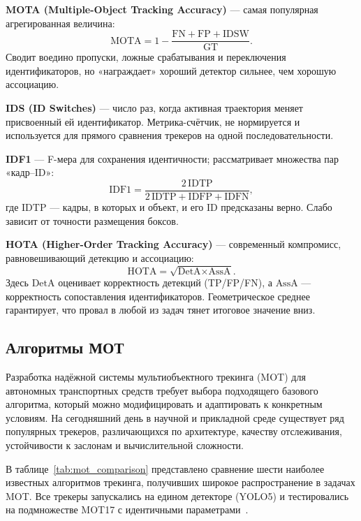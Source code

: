 \textbf{MOTA (Multiple-Object Tracking Accuracy)} --- самая популярная агрегированная величина:  
  \[
     \text{MOTA}=1-\frac{\mathrm{FN}+\mathrm{FP}+\mathrm{IDSW}}{\mathrm{GT}} .
  \]
  Сводит воедино пропуски, ложные срабатывания и переключения идентификаторов, но «награждает» хороший детектор сильнее, чем хорошую ассоциацию.

\textbf{IDS (ID Switches)} --- число раз, когда активная траектория меняет присвоенный ей идентификатор. Метрика-счётчик, не нормируется и используется для прямого сравнения трекеров на одной последовательности.

\textbf{IDF1} --- F-мера для сохранения идентичности; рассматривает множества пар «кадр–ID»:  
  \[
     \text{IDF1}= \frac{2\,\mathrm{IDTP}}{2\,\mathrm{IDTP}+\mathrm{IDFP}+\mathrm{IDFN}} ,
  \]
  где \(\mathrm{IDTP}\) — кадры, в которых и объект, и его ID предсказаны верно. Слабо зависит от точности размещения боксов.

\textbf{HOTA (Higher-Order Tracking Accuracy)} --- современный компромисс, равновешивающий детекцию и ассоциацию:  
  \[
     \text{HOTA}= \sqrt{\text{DetA}\times\text{AssA}} .
  \]
  Здесь \(\text{DetA}\) оценивает корректность детекций (TP/FP/FN), а \(\text{AssA}\) — корректность сопоставления идентификаторов. Геометрическое среднее гарантирует, что провал в любой из задач тянет итоговое значение вниз.

\subsection{Алгоритмы МОТ}\label{subsec:mot_algotithms}

Разработка надёжной системы мультиобъектного трекинга (MOT) для автономных транспортных средств требует выбора подходящего базового алгоритма, который можно модифицировать и адаптировать к конкретным условиям. На сегодняшний день в научной и прикладной среде существует ряд популярных трекеров, различающихся по архитектуре, качеству отслеживания, устойчивости к заслонам и вычислительной сложности.

В таблице~\ref{tab:mot_comparison} представлено сравнение шести наиболее известных алгоритмов трекинга, получивших широкое распространение в задачах MOT. Все трекеры запускались на едином детекторе (YOLO5) и тестировались на подмножестве MOT17 с идентичными параметрами~\cite{zhang2021bytetrack, cao2022observation, bewley2016simple, zhang2020fairmot, meinhardt2022trackformer, zeng2022motr}.

